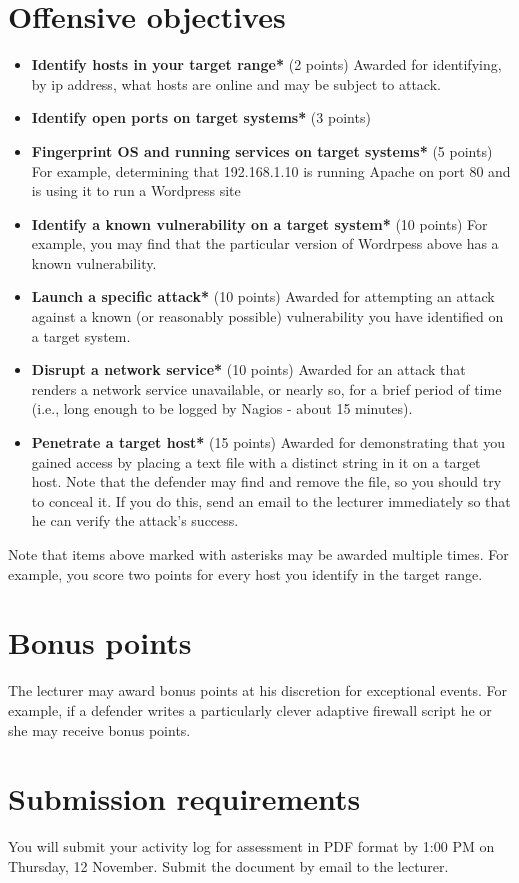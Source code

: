 \documentclass{article}   	%
\begin{document}
\section*{Offensive objectives}
\begin{itemize}
  \item \textbf{Identify hosts in your target range*} (2 points)  Awarded for identifying, by ip address, what hosts are online and may be subject to attack.
  \item \textbf{Identify open ports on target systems*} (3 points)  
  \item \textbf{Fingerprint OS and running services on target systems*} (5 points) For example, determining that 192.168.1.10 is running Apache on port 80 and is using it to run a Wordpress site
  \item \textbf{Identify a known vulnerability on a target system*} (10 points) For example, you may find that the particular version of Wordrpess above has a known vulnerability.
  \item \textbf{Launch a specific attack*} (10 points) Awarded for attempting an attack against a known (or reasonably possible) vulnerability you have identified on a target system.
  \item \textbf{Disrupt a network service*} (10 points) Awarded for an attack that renders a network service unavailable, or nearly so, for a brief period of time (i.e., long enough to be logged by Nagios - about 15 minutes).
  \item \textbf{Penetrate a target host*} (15 points) Awarded for demonstrating that you gained access by placing a text file with a distinct string in it on a target host.  Note that the defender may find and remove the file, so you should try to conceal it. If you do this, send an email to the lecturer immediately so that he can verify the attack's success.
  
\end{itemize}

Note that items above marked  with asterisks may be awarded multiple times. For example, you score two points for every host you identify in the target range.

\section*{Bonus points}
The lecturer may award bonus points at his discretion for exceptional events.  For example, if a defender writes a particularly clever adaptive firewall script he or she may receive bonus points.

\section*{Submission requirements} You will submit your activity log for assessment in PDF format by 1:00 PM on Thursday, 12 November.  Submit the document by email to the lecturer.
\end{document}
